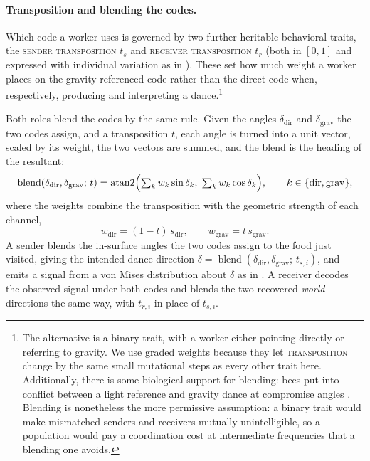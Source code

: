 \documentclass[11pt]{article}
\newcommand{\trait}[1]{\textsc{#1}}
\begin{document}
\paragraph{Transposition and blending the codes.}
Which code a worker uses is governed by two further heritable behavioral traits,
the \trait{sender transposition} $t_s$ and \trait{receiver transposition} $t_r$
(both in $[0,1]$ and expressed with individual variation as in
). These set how much weight a worker places on the
gravity-referenced code rather than the direct code when, respectively,
producing and interpreting a dance.\footnote{The alternative is a binary trait,
with a worker either pointing directly or referring to gravity. We use graded
weights because they let \trait{transposition} change by the same small
mutational steps as every other trait here. Additionally, there
is some biological support for blending: bees put into conflict between a light
reference and gravity dance at compromise angles \citep{edrich1977interaction}.
Blending is nonetheless the more permissive assumption: a binary trait would
make mismatched senders and receivers mutually unintelligible, so a population
would pay a coordination cost at intermediate frequencies that a blending one
avoids.}

Both roles blend the codes by the same rule. Given the angles
$\delta_{\mathrm{dir}}$ and $\delta_{\mathrm{grav}}$ the two codes assign, and a
transposition $t$, each angle is turned into a unit vector, scaled by its weight,
the two vectors are summed, and the blend is the heading of the resultant:
\begin{equation}
  \operatorname{blend}(\delta_{\mathrm{dir}}, \delta_{\mathrm{grav}};\, t)
    = \operatorname{atan2}\Bigl(\textstyle\sum_k w_k \sin\delta_k,\;
      \sum_k w_k \cos\delta_k\Bigr),
  \qquad k \in \{\mathrm{dir}, \mathrm{grav}\},
\end{equation}
where the weights combine the transposition with the geometric strength of
each channel,
\begin{equation}
  w_{\mathrm{dir}} = (1 - t)\,s_{\mathrm{dir}}, \qquad
  w_{\mathrm{grav}} = t\,s_{\mathrm{grav}}.
\end{equation}
A sender blends the in-surface angles the two codes assign to the food just
visited, giving the intended dance direction
$\delta = \operatorname{blend}(\delta_{\mathrm{dir}}, \delta_{\mathrm{grav}};\,
t_{s,i})$, and emits a signal from a von Mises distribution about $\delta$ as in
. A receiver decodes the observed signal under both codes and
blends the two recovered \emph{world} directions the same way, with $t_{r,i}$ in
place of $t_{s,i}$.
\end{document}
